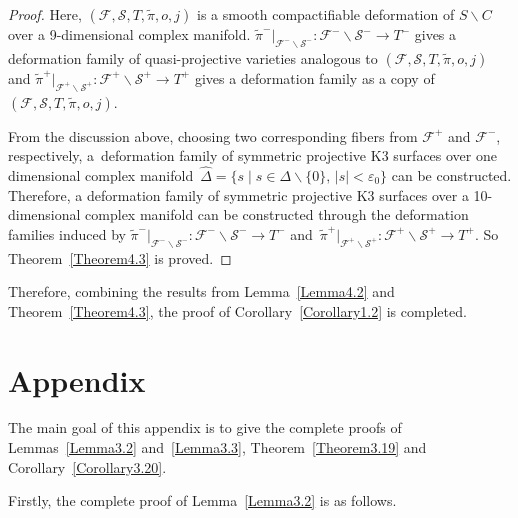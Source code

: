 \documentclass[10pt,a4paper]{amsart}
\numberwithin{equation}{section}
\begin{document}
\begin{proof}
Here, $(\mathcal{F},\mathcal{S},T,\widetilde{\pi},o,j)$ is a smooth compactifiable deformation of $S \backslash C$ over a 9-di\-men\-sion\-al complex manifold. $\widetilde{\pi}^-|_{\mathcal{F}^-\backslash \mathcal{S}^-}\colon {\mathcal{F}^-\backslash \mathcal{S}^-} \rightarrow T^-$ gives a deformation family of quasi-projective varieties analogous to $(\mathcal{F},\mathcal{S},T,\widetilde{\pi},o,j)$ and $\widetilde{\pi}^+|_{\mathcal{F}^+\backslash \mathcal{S}^+}\colon{\mathcal{F}^+\backslash \mathcal{S}^+} \rightarrow T^+$ gives a deformation family as a copy of $(\mathcal{F},\mathcal{S},T,\widetilde{\pi},o,j)$.

From the discussion above, choosing two corresponding fibers from $\mathcal{F}^+$ and $\mathcal{F}^-$, respectively, a~deformation family of symmetric projective K3 surfaces over one dimensional complex manifold~$\hat{\Delta}=\{ s\mid s \in \Delta \backslash \{ 0 \}, \, |s|<\varepsilon_0 \}$ can be constructed. Therefore, a deformation family of symmetric projective K3 surfaces over a 10-dimensional complex manifold can be constructed through the deformation families induced by $\widetilde{\pi}^-|_{\mathcal{F}^-\backslash \mathcal{S}^-}\colon{\mathcal{F}^-\backslash \mathcal{S}^-} \rightarrow T^-$ and~$\widetilde{\pi}^+|_{\mathcal{F}^+\backslash \mathcal{S}^+}\colon{\mathcal{F}^+\backslash \mathcal{S}^+} \rightarrow T^+$. So Theorem~\ref{Theorem4.3} is proved.
\end{proof}

Therefore, combining the results from Lemma~\ref{Lemma4.2} and Theorem~\ref{Theorem4.3}, the proof of Corollary~\ref{Corollary1.2} is completed.

\appendix

\section{Appendix}\label{appendixA}

The main goal of this appendix is to give the complete proofs of Lemmas~\ref{Lemma3.2} and~\ref{Lemma3.3}, Theorem~\ref{Theorem3.19} and Corollary~\ref{Corollary3.20}.

Firstly, the complete proof of Lemma~\ref{Lemma3.2} is as follows.
\end{document}
